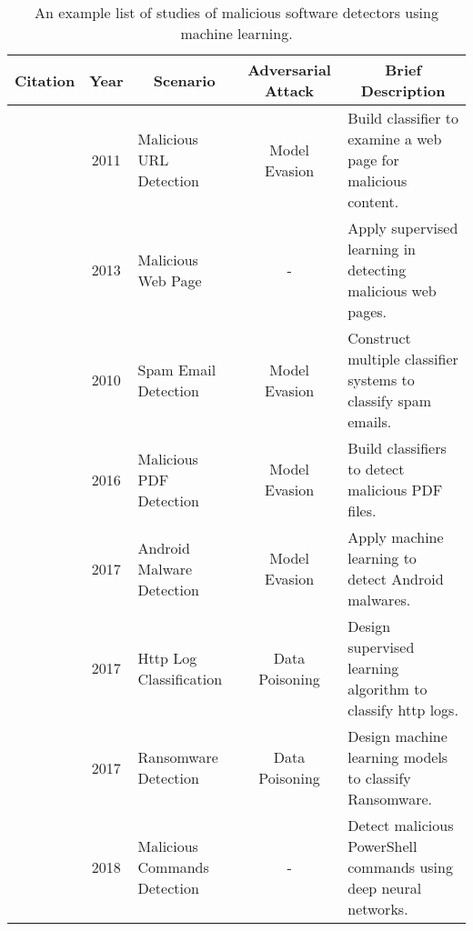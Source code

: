 \begin{table*}[!htbp]
\centering
\footnotesize
\caption{An example list of studies of malicious software detectors using machine learning.}
\begin{tabular}{|c|c|l|c|l|}
\hline
\textbf{Citation} & \textbf{Year} & \multicolumn{1}{c|}{\textbf{Scenario}} & \textbf{Adversarial Attack} & \multicolumn{1}{c|}{\textbf{Brief Description}} \\ \hline
~\cite{canali2011prophiler} & 2011 & Malicious URL Detection & Model Evasion & Build classifier to examine a web page for malicious content. \\ \hline
~\cite{eshete2012binspect} & 2013 & Malicious Web Page & - & Apply supervised
learning in detecting malicious web pages. \\ \hline
~\cite{biggio2010multiple} & 2010 & Spam Email Detection & Model Evasion & Construct multiple classifier systems to classify spam emails.\\ \hline
~\cite{xu2016automatically} & 2016 & Malicious PDF Detection & Model Evasion & Build classifiers to detect malicious PDF files. \\ \hline
~\cite{grosse2017adversarial} & 2017 & Android Malware Detection & Model Evasion & Apply machine learning to detect Android malwares. \\ \hline
~\cite{liu2017robust} & 2017 & Http Log Classification & Data Poisoning & Design supervised learning algorithm to classify http logs. \\ \hline
~\cite{munoz2017towards} & 2017 & Ransomware Detection & Data Poisoning & Design machine learning models to classify Ransomware. \\ \hline
~\cite{hendler2018detecting} & 2018 & Malicious Commands Detection & - & Detect malicious PowerShell commands using deep neural networks. \\ \hline
\end{tabular}
\end{table*}


